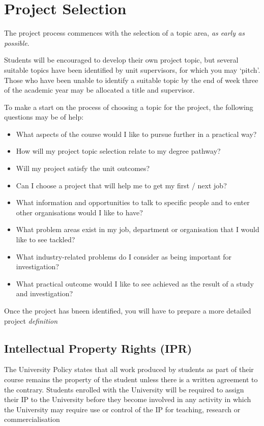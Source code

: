 \chapter{Project Selection}

The project process commences with the selection of a topic area, \textit{as early as possible}.

\begin{tcolorbox}
    Students will be encouraged to develop their own project topic, but several suitable topics have been identified by unit supervisors, for
    which you may ‘pitch’. Those who have been unable to identify a suitable topic by the end of week three of the academic year may be
    allocated a title and supervisor.
\end{tcolorbox}
    
To make a start on the process of choosing a topic for the project, the following questions may be of
help:

\begin{itemize}
    \item What aspects of the course would I like to pursue further in a practical way?
    \item How will my project topic selection relate to my degree pathway?
    \item Will my project satisfy the unit outcomes?
    \item Can I choose a project that will help me to get my first / next job?
    \item What information and opportunities to talk to specific people and to enter other
    organisations would I like to have?
    \item What problem areas exist in my job, department or organisation that I would like to see
    tackled?
    \item What industry-related problems do I consider as being important for investigation?
    \item What practical outcome would I like to see achieved as the result of a study and
    investigation?
\end{itemize}

Once the project has bneen identified, you will have to prepare a more detailed project \textit{definition}

\section{Intellectual Property Rights (IPR)}

The University Policy states that all work produced by students as part of their course remains the property of the student unless there is a written agreement to the contrary. Students enrolled with
the University will be required to assign their IP to the University before they become involved in
any activity in which the University may require use or control of the IP for teaching, research or
commercialisation

